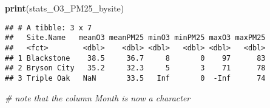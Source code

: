 \documentclass[]{article}
\newenvironment{Shaded}{\begin{snugshade}}{\end{snugshade}}
\newcommand{\KeywordTok}[1]{\textcolor[rgb]{0.13,0.29,0.53}{\textbf{#1}}}
\newcommand{\CommentTok}[1]{\textcolor[rgb]{0.56,0.35,0.01}{\textit{#1}}}
\newcommand{\NormalTok}[1]{#1}
\begin{document}
\begin{Shaded}
\begin{Highlighting}[]
\KeywordTok{print}\NormalTok{(stats_O3_PM25_bysite)}
\end{Highlighting}
\end{Shaded}

\begin{verbatim}
## # A tibble: 3 x 7
##   Site.Name   meanO3 meanPM25 minO3 minPM25 maxO3 maxPM25
##   <fct>        <dbl>    <dbl> <dbl>   <dbl> <dbl>   <dbl>
## 1 Blackstone    38.5     36.7     8       0    97      83
## 2 Bryson City   35.2     32.3     5       3    71      78
## 3 Triple Oak   NaN       33.5   Inf       0  -Inf      74
\end{verbatim}

\begin{Shaded}
\begin{Highlighting}[]
\CommentTok{# note that the column Month is now a character}
\end{Highlighting}
\end{Shaded}
\end{document}

